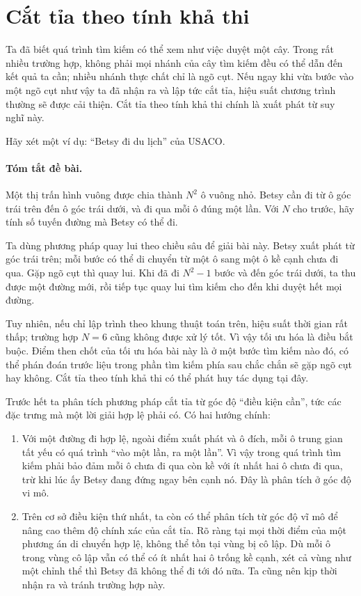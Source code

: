\documentclass[11pt]{article}
\begin{document}
\section{Cắt tỉa theo tính khả thi}

Ta đã biết quá trình tìm kiếm có thể xem như việc duyệt một cây. Trong rất
nhiều trường hợp, không phải mọi nhánh của cây tìm kiếm đều có thể dẫn đến
kết quả ta cần; nhiều nhánh thực chất chỉ là ngõ cụt. Nếu ngay khi vừa bước
vào một ngõ cụt như vậy ta đã nhận ra và lập tức cắt tỉa, hiệu suất chương
trình thường sẽ được cải thiện. Cắt tỉa theo tính khả thi chính là xuất phát
từ suy nghĩ này.

Hãy xét một ví dụ: ``Betsy đi du lịch'' của USACO.

\paragraph{Tóm tắt đề bài.}
Một thị trấn hình vuông được chia thành \(N^2\) ô vuông nhỏ. Betsy cần đi từ
ô góc trái trên đến ô góc trái dưới, và đi qua mỗi ô đúng một lần. Với \(N\)
cho trước, hãy tính số tuyến đường mà Betsy có thể đi.

Ta dùng phương pháp quay lui theo chiều sâu để giải bài này. Betsy xuất phát
từ góc trái trên; mỗi bước có thể di chuyển từ một ô sang một ô kề cạnh chưa
đi qua. Gặp ngõ cụt thì quay lui. Khi đã đi \(N^2-1\) bước và đến góc trái
dưới, ta thu được một đường mới, rồi tiếp tục quay lui tìm kiếm cho đến khi
duyệt hết mọi đường.

Tuy nhiên, nếu chỉ lập trình theo khung thuật toán trên, hiệu suất thời gian
rất thấp; trường hợp \(N=6\) cũng không được xử lý tốt. Vì vậy tối ưu hóa là
điều bắt buộc. Điểm then chốt của tối ưu hóa bài này là ở một bước tìm kiếm
nào đó, có thể phán đoán trước liệu trong phần tìm kiếm phía sau chắc chắn sẽ
gặp ngõ cụt hay không. Cắt tỉa theo tính khả thi có thể phát huy tác dụng tại
đây.

Trước hết ta phân tích phương pháp cắt tỉa từ góc độ ``điều kiện cần'', tức
các đặc trưng mà một lời giải hợp lệ phải có. Có hai hướng chính:
\begin{enumerate}
  \item Với một đường đi hợp lệ, ngoài điểm xuất phát và ô đích, mỗi ô trung
  gian tất yếu có quá trình ``vào một lần, ra một lần''. Vì vậy trong quá
  trình tìm kiếm phải bảo đảm mỗi ô chưa đi qua còn kề với ít nhất hai ô chưa
  đi qua, trừ khi lúc ấy Betsy đang đứng ngay bên cạnh nó. Đây là phân tích ở
  góc độ vi mô.

  \item Trên cơ sở điều kiện thứ nhất, ta còn có thể phân tích từ góc độ vĩ
  mô để nâng cao thêm độ chính xác của cắt tỉa. Rõ ràng tại mọi thời điểm của
  một phương án di chuyển hợp lệ, không thể tồn tại vùng bị cô lập. Dù mỗi ô
  trong vùng cô lập vẫn có thể có ít nhất hai ô trống kề cạnh, xét cả vùng
  như một chỉnh thể thì Betsy đã không thể đi tới đó nữa. Ta cũng nên kịp
  thời nhận ra và tránh trường hợp này.
\end{enumerate}
\end{document}
